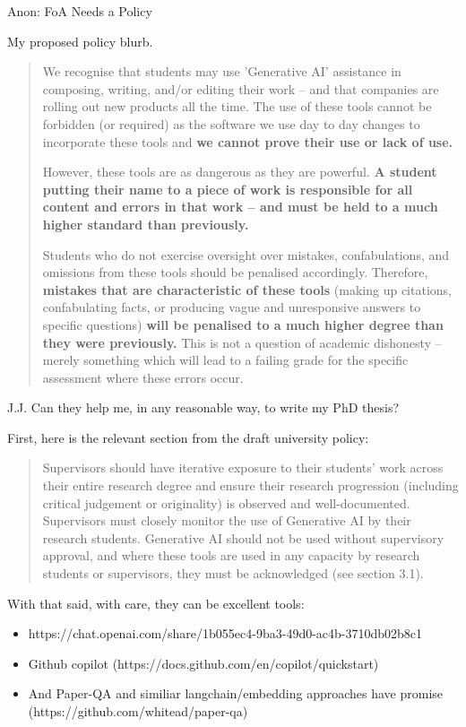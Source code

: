 \documentclass[aspectratio=169]{beamer}
\begin{document}
\begin{frame}{Anon: FoA Needs a Policy}

My proposed policy blurb.
{\small
\begin{quote}
    We recognise that students may use 'Generative AI' assistance in composing, writing, and/or editing their work -- and that companies are rolling out new products all the time. The use of these tools cannot be forbidden (or required) as the software we use day to day changes to incorporate these tools and \textbf{we cannot prove their use or lack of use.}

However, these tools are as dangerous as they are powerful.\textbf{ A student putting their name to a piece of work is responsible for all content and errors in that work -- and must be held to a much higher standard than previously.}

Students who do not exercise oversight over mistakes, confabulations, and omissions from these tools should be penalised accordingly. Therefore, \textbf{mistakes that are characteristic of these tools} (making up citations, confabulating facts, or producing vague and unresponsive answers to specific questions) \textbf{will be penalised to a much higher degree than they were previously.} This is not a question of academic dishonesty -- merely something which will lead to a failing grade for the specific assessment where these errors occur.
\end{quote}
}
\end{frame}

\begin{frame}{J.J. Can they help me, in any reasonable way, to write my PhD thesis?}

First, here is the relevant section from the draft university policy:

\begin{quote}
    Supervisors should have iterative exposure to their students’ work across their entire research degree and ensure their research progression (including critical judgement or originality) is observed and well-documented. Supervisors must closely monitor the use of Generative AI by their research students. Generative AI should not be used without supervisory approval, and where these tools are used in any capacity by research students or supervisors, they must be acknowledged (see section 3.1).  
\end{quote}

With that said, with care, they can be excellent tools:

\begin{itemize}
    \item https://chat.openai.com/share/1b055ec4-9ba3-49d0-ac4b-3710db02b8c1
    \item Github copilot (https://docs.github.com/en/copilot/quickstart)
    \item And Paper-QA and similiar langchain/embedding approaches have promise (https://github.com/whitead/paper-qa)
\end{itemize}
    
\end{frame}
\end{document}
